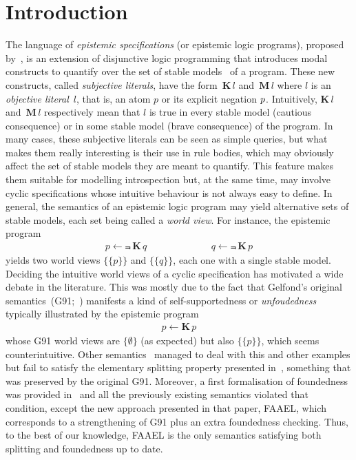 \documentclass{new_tlp}
\def\K{\mathbf{K}\, }
\def\M{\mathbf{M}\, }
\let\sneg\relax
\newcommand{\sneg}{\ensuremath{\text{-}}}
\begin{document}
\section{Introduction}
\label{sec:intro}

The language of \emph{epistemic specifications} (or epistemic logic programs), proposed by~, is an extension of disjunctive logic programming that introduces modal constructs to quantify over the set of stable models~\cite{gellif88b} of a program.
%
These new constructs, called \emph{subjective literals}, have the form~$\K l$ and~$\M l$ where $l$ is an \emph{objective literal}~$l$, that is, an atom $p$ or its explicit negation $\sneg p$.
%
Intuitively, $\K l$ and~$\M l$ respectively mean that $l$ is true in every stable model (cautious consequence) or in some stable model (brave consequence) of the program.
%
In many cases, these subjective literals can be seen as simple queries, but what makes them really interesting is their use in rule bodies, which may obviously affect the set of stable models they are meant to quantify.
%
This feature makes them suitable for modelling introspection but, at the same time, may involve cyclic specifications whose intuitive behaviour is not always easy to define.
%
In general, the semantics of an epistemic logic program may yield alternative sets of stable models, each set being called a \emph{world view}.
%
For instance, the epistemic program
\begin{eqnarray}
p \leftarrow \Not \, \K q \hspace{80pt}
q \leftarrow \Not \, \K p  \label{f:epiloop}
\end{eqnarray}
%
yields two world views $\{\{p\}\}$ and $\{\{q\}\}$, each one with a single stable model.
%
Deciding the intuitive world views of a cyclic specification has motivated a wide debate in the literature.
%
This was mostly due to the fact that Gelfond's original \mbox{semantics (G91;~)} manifests a kind of self-supportedness or \emph{unfoudedness} typically illustrated by the epistemic program
\begin{eqnarray}
p \leftarrow \K p \label{f:selfsupport}
\end{eqnarray}
whose G91 world views are $\{\emptyset\}$ (as expected) but also $\{\{p\}\}$, which seems counterintuitive.
%
Other semantics~\cite{kawabagezh15,faheir15a,sheeit17a} managed to deal with this and other examples but fail to satisfy the elementary splitting property presented in~\cite{cafafa19a}, something that was preserved by the original G91.
%
Moreover, a first formalisation of foundedness was provided in~\cite{cafafa19b} and all the previously existing semantics violated that condition, except the new approach presented in that paper, FAAEL, which corresponds to a strengthening of G91 plus an extra foundedness checking.
%
Thus, to the best of our knowledge, FAAEL is the only semantics satisfying both splitting and foundedness up to date.
\end{document}
